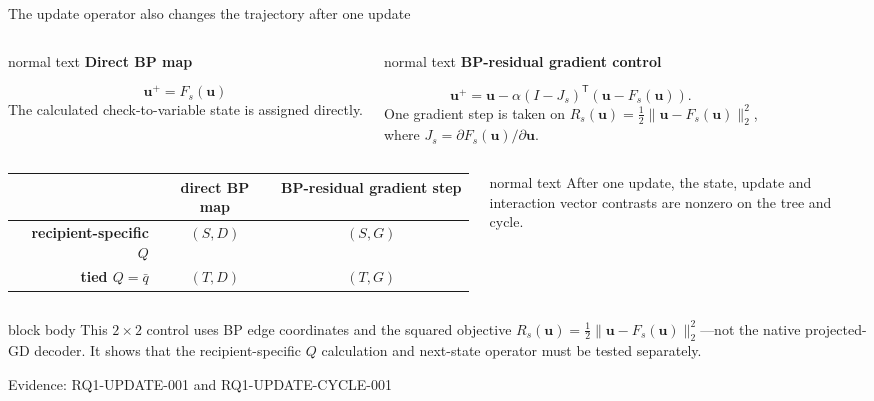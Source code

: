 \documentclass[aspectratio=169,9pt,t]{beamer}
\newcommand{\evidence}[1]{%
  \vfill\hfill{\fontsize{5.8}{6.8}\selectfont\color{Muted}Evidence: #1}}
\newcommand{\scopebox}[1]{%
  \begin{beamercolorbox}[rounded=true,sep=1.3ex]{block body}
    \small #1
  \end{beamercolorbox}}
\begin{document}
\begin{frame}{The update operator also changes the trajectory after one update}
  \begin{columns}[T,onlytextwidth]
    \begin{beamercolorbox}[rounded=true,sep=1.4ex]{normal text}
      \centering\textcolor{BP}{\large\bfseries Direct BP map}\par\vspace{2mm}
      \[
        \mathbf u^{+}=F_s(\mathbf u)
      \]
      The calculated check-to-variable state is assigned directly.
    \end{beamercolorbox}

    \begin{beamercolorbox}[rounded=true,sep=1.4ex]{normal text}
      \centering\textcolor{Graph}{\large\bfseries BP-residual gradient control}\par\vspace{2mm}
      \[
        \mathbf u^{+}=\mathbf u-\alpha
        (I-J_s)^{\mathsf T}(\mathbf u-F_s(\mathbf u)).
      \]
      One gradient step is taken on
      $R_s(\mathbf u)=\tfrac12\lVert\mathbf u-F_s(\mathbf u)\rVert_2^2$,\\
      {\scriptsize where $J_s=\partial F_s(\mathbf u)/\partial\mathbf u$.}
    \end{beamercolorbox}
  \end{columns}

  \vspace{1mm}
  \begin{columns}[c,onlytextwidth]
      \centering\scriptsize
      \renewcommand{\arraystretch}{1.25}
      \begin{tabular}{>{\bfseries}r|cc}
        & direct BP map & BP-residual gradient step\\
        \hline
        recipient-specific $Q$ & $(S,D)$ & $(S,G)$\\
        tied $Q=\bar q$ & $(T,D)$ & $(T,G)$
      \end{tabular}
      \begin{beamercolorbox}[rounded=true,sep=1.1ex]{normal text}
        \centering\small After one update, the state, update and interaction vector contrasts are nonzero on the tree and cycle.
      \end{beamercolorbox}
  \end{columns}

  \vspace{0mm}
  \scopebox{This $2\times2$ control uses BP edge coordinates and the squared objective $R_s(\mathbf u)=\tfrac12\lVert\mathbf u-F_s(\mathbf u)\rVert_2^2$---not the native projected-GD decoder. It shows that the recipient-specific $Q$ calculation and next-state operator must be tested separately.}
  \evidence{RQ1-UPDATE-001 and RQ1-UPDATE-CYCLE-001}
\end{frame}
\end{document}
